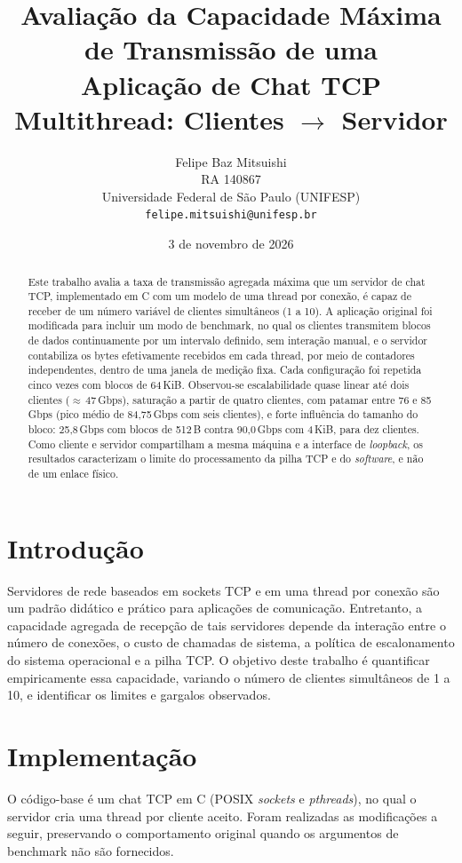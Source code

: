 \documentclass[12pt,a4paper]{article}
\title{\textbf{Avaliação da Capacidade Máxima de Transmissão de uma\\
Aplicação de Chat TCP Multithread: Clientes $\rightarrow$ Servidor}}
\author{Felipe Baz Mitsuishi\\
RA 140867\\
Universidade Federal de São Paulo (UNIFESP)\\
\texttt{felipe.mitsuishi@unifesp.br}}
\date{3 de novembro de 2026}
\newcommand{\SI}[2]{\mbox{#1\,#2}}
\begin{document}
\maketitle

\begin{abstract}
Este trabalho avalia a taxa de transmissão agregada máxima que um servidor de
chat TCP, implementado em C com um modelo de uma thread por conexão, é capaz de
receber de um número variável de clientes simultâneos (1 a 10). A aplicação
original foi modificada para incluir um modo de benchmark, no qual os clientes
transmitem blocos de dados continuamente por um intervalo definido, sem
interação manual, e o servidor contabiliza os bytes efetivamente recebidos em
cada thread, por meio de contadores independentes, dentro de uma janela de
medição fixa. Cada configuração foi repetida cinco vezes com blocos de
\SI{64}{KiB}. Observou-se escalabilidade quase linear até dois clientes
($\approx$\,\SI{47}{Gbps}), saturação a partir de quatro clientes, com
patamar entre 76 e \SI{85}{Gbps} (pico médio de \SI{84{,}75}{Gbps} com seis
clientes), e forte influência do tamanho do bloco: \SI{25{,}8}{Gbps} com
blocos de \SI{512}{B} contra \SI{90{,}0}{Gbps} com \SI{4}{KiB}, para dez
clientes. Como cliente e servidor compartilham a mesma máquina e a interface de
\textit{loopback}, os resultados caracterizam o limite do processamento da
pilha TCP e do \textit{software}, e não de um enlace físico.
\end{abstract}

\section{Introdução}

Servidores de rede baseados em sockets TCP e em uma thread por conexão são um
padrão didático e prático para aplicações de comunicação. Entretanto, a
capacidade agregada de recepção de tais servidores depende da interação entre
o número de conexões, o custo de chamadas de sistema, a política de
escalonamento do sistema operacional e a pilha TCP. O objetivo deste trabalho é
quantificar empiricamente essa capacidade, variando o número de clientes
simultâneos de 1 a 10, e identificar os limites e gargalos observados.

\section{Implementação}

O código-base é um chat TCP em C (POSIX \textit{sockets} e \textit{pthreads}),
no qual o servidor cria uma thread por cliente aceito. Foram realizadas as
modificações a seguir, preservando o comportamento original quando os
argumentos de benchmark não são fornecidos.
\end{document}
